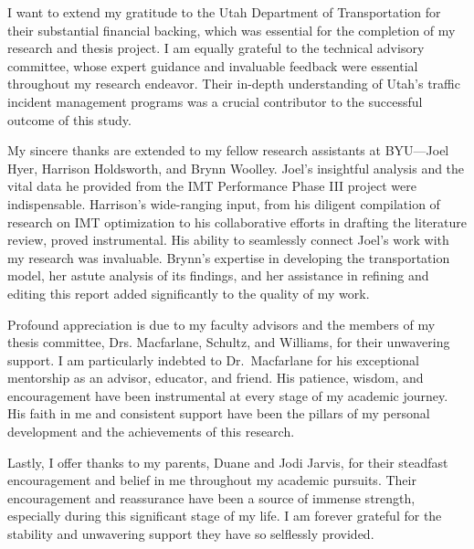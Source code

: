 \documentclass[fancy, oneside, mastersfancy, ms]{byuthesis}
\begin{document}
\begin{acknowledgments}
I want to extend my gratitude to the Utah Department of Transportation
for their substantial financial backing, which was essential for the
completion of my research and thesis project. I am equally grateful to
the technical advisory committee, whose expert guidance and invaluable
feedback were essential throughout my research endeavor. Their in-depth
understanding of Utah's traffic incident management programs was a
crucial contributor to the successful outcome of this study.

My sincere thanks are extended to my fellow research assistants at
BYU---Joel Hyer, Harrison Holdsworth, and Brynn Woolley. Joel's
insightful analysis and the vital data he provided from the IMT
Performance Phase III project were indispensable. Harrison's
wide-ranging input, from his diligent compilation of research on IMT
optimization to his collaborative efforts in drafting the literature
review, proved instrumental. His ability to seamlessly connect Joel's
work with my research was invaluable. Brynn's expertise in developing
the transportation model, her astute analysis of its findings, and her
assistance in refining and editing this report added significantly to
the quality of my work.

Profound appreciation is due to my faculty advisors and the members of
my thesis committee, Drs. Macfarlane, Schultz, and Williams, for their
unwavering support. I am particularly indebted to Dr.~Macfarlane for his
exceptional mentorship as an advisor, educator, and friend. His
patience, wisdom, and encouragement have been instrumental at every
stage of my academic journey. His faith in me and consistent support
have been the pillars of my personal development and the achievements of
this research.

Lastly, I offer thanks to my parents, Duane and Jodi Jarvis, for their
steadfast encouragement and belief in me throughout my academic
pursuits. Their encouragement and reassurance have been a source of
immense strength, especially during this significant stage of my life. I
am forever grateful for the stability and unwavering support they have
so selflessly provided.
\end{acknowledgments}
\cleardoublepage

	\tableofcontents*
	\cleardoublepage

	\listoffigures
	\cleardoublepage

	\listoftables
	\cleardoublepage

\mainmatter
{}
\end{document}
